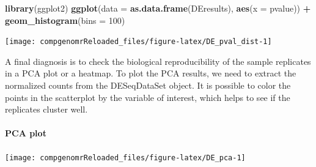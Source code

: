 \documentclass[12pt,]{krantz}
\newenvironment{Shaded}{\begin{snugshade}}{\end{snugshade}}
\newcommand{\CommentTok}[1]{\textcolor[rgb]{0.56,0.35,0.01}{\textit{#1}}}
\newcommand{\DataTypeTok}[1]{\textcolor[rgb]{0.13,0.29,0.53}{#1}}
\newcommand{\DecValTok}[1]{\textcolor[rgb]{0.00,0.00,0.81}{#1}}
\newcommand{\KeywordTok}[1]{\textcolor[rgb]{0.13,0.29,0.53}{\textbf{#1}}}
\newcommand{\NormalTok}[1]{#1}
\newcommand{\OperatorTok}[1]{\textcolor[rgb]{0.81,0.36,0.00}{\textbf{#1}}}
\newcommand{\OtherTok}[1]{\textcolor[rgb]{0.56,0.35,0.01}{#1}}
\newcommand{\StringTok}[1]{\textcolor[rgb]{0.31,0.60,0.02}{#1}}
\let\oldparagraph\paragraph
\renewcommand{\paragraph}[1]{\oldparagraph{#1}\mbox{}}
\begin{document}
\begin{Shaded}
\begin{Highlighting}[]
\KeywordTok{library}\NormalTok{(ggplot2)}
\KeywordTok{ggplot}\NormalTok{(}\DataTypeTok{data =} \KeywordTok{as.data.frame}\NormalTok{(DEresults), }\KeywordTok{aes}\NormalTok{(}\DataTypeTok{x =}\NormalTok{ pvalue)) }\OperatorTok{+}\StringTok{ }\KeywordTok{geom_histogram}\NormalTok{(}\DataTypeTok{bins =} \DecValTok{100}\NormalTok{)}
\end{Highlighting}
\end{Shaded}

\begin{center}\texttt{[image: compgenomrReloaded\_files/figure-latex/DE\_pval\_dist-1]} \end{center}

A final diagnosis is to check the biological reproducibility of the sample replicates in a PCA plot or a heatmap. To plot the PCA results, we need to extract the normalized counts from the DESeqDataSet object. It is possible to color the points in the scatterplot by the variable of interest, which helps to see if the replicates cluster well.

\hypertarget{pca-plot}{%
\paragraph{PCA plot}\label{pca-plot}}

\begin{Shaded}
\end{Shaded}

\begin{center}\texttt{[image: compgenomrReloaded\_files/figure-latex/DE\_pca-1]} \end{center}
\end{document}
